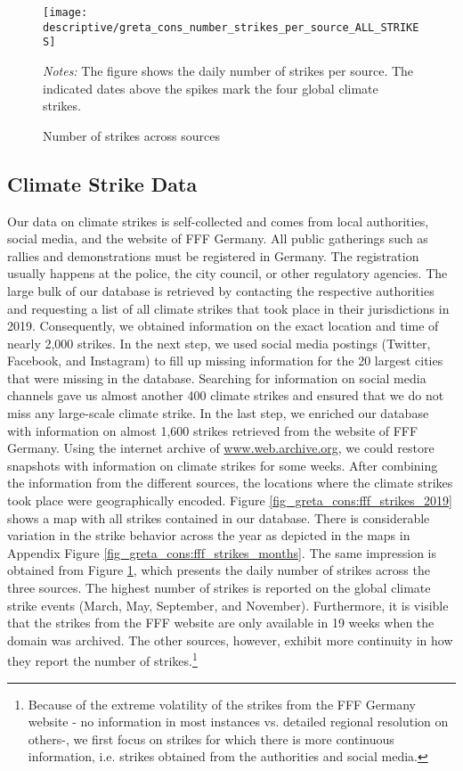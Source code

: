 \begin{figure}[t]\centering
	\texttt{[image: descriptive/greta\_cons\_number\_strikes\_per\_source\_ALL\_STRIKES]}
	\begin{minipage}{0.8\linewidth}
		\caption{Number of strikes across sources}\label{fig_greta_cons:number_strikes_per_source}
		\scriptsize{\emph{Notes:} The figure shows the daily number of strikes per source. The indicated dates above the spikes mark the four global climate strikes.}
	\end{minipage}
\end{figure}



\subsection{Climate Strike Data}
Our data on climate strikes is self-collected and comes from local authorities, social media, and the website of FFF Germany. All public gatherings such as rallies and demonstrations must be registered in Germany. The registration usually happens at the police, the city council, or other regulatory agencies. The large bulk of our database is retrieved by contacting the respective authorities and requesting a list of all climate strikes that took place in their jurisdictions in 2019. Consequently, we obtained information on the exact location and time of nearly 2,000 strikes. In the next step, we used social media postings (Twitter, Facebook, and Instagram) to fill up missing information for the 20 largest cities that were missing in the database. Searching for information on social media channels gave us almost another 400 climate strikes and ensured that we do not miss any large-scale climate strike. In the last step, we enriched our database with information on almost 1,600 strikes retrieved from the website of FFF Germany. Using the internet archive of \url{www.web.archive.org}, we could restore snapshots with information on climate strikes for some weeks. After combining the information from the different sources, the locations where the climate strikes took place were geographically encoded. Figure \ref{fig_greta_cons:fff_strikes_2019} shows a map with all strikes contained in our database. There is considerable variation in the strike behavior across the year as depicted in the maps in Appendix Figure \ref{fig_greta_cons:fff_strikes_months}. The same impression is obtained from Figure \ref{fig_greta_cons:number_strikes_per_source}, which presents the daily number of strikes across the three sources. The highest number of strikes is reported on the global climate strike events (March, May, September, and November). Furthermore, it is visible that the strikes from the FFF website are only available in 19 weeks when the domain was archived. The other sources, however, exhibit more continuity in how they report the number of strikes.\footnote{Because of the extreme volatility of the strikes from the FFF Germany website - no information in most instances vs. detailed regional resolution on others-, we first focus on strikes for which there is more continuous information, i.e. strikes obtained from the authorities and social media.} 
